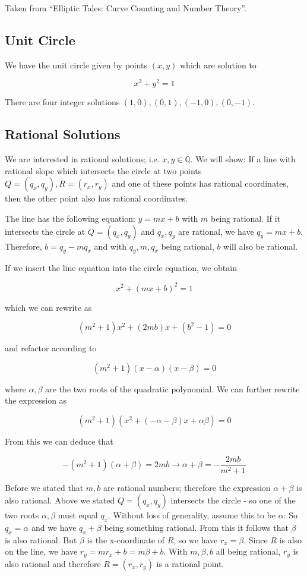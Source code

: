 
Taken from ``Elliptic Tales: Curve Counting and Number Theory''.

\subsection{Unit Circle}

We have the unit circle given by points \((x,y)\) which are solution to

\[
x^2 + y^2 = 1
\]

There are four integer solutions \((1,0), (0,1), (-1,0), (0,-1)\).

\subsection{Rational Solutions}

We are interested in rational solutions; i.e. \(x, y \in \mathbb{Q}\).
We will show: If a line with rational slope which intersects the circle
at two points \(Q = (q_x, q_y), R = (r_x, r_y)\) and one of these points
has rational coordinates, then the other point also has rational
coordinates.

The line has the following equation: \(y = mx + b\) with \(m\) being
rational. If it intersects the circle at \(Q = (q_x, q_y)\) and
\(q_x, q_y\) are rational, we have \(q_y = m x + b\). Therefore,
\(b = q_y - m q_x\) and with \(q_y, m, q_x\) being rational, \(b\) will
also be rational.

If we insert the line equation into the circle equation, we obtain

\[
x^2 + (m x + b)^2 = 1
\]

which we can rewrite as

\[
(m^2 + 1) x^2 + (2mb)x + (b^2 - 1) = 0
\]

and refactor according to

\[
(m^2 + 1)(x - \alpha)(x - \beta) = 0
\]

where \(\alpha, \beta\) are the two roots of the quadratic polynomial.
We can further rewrite the expression as

\[
(m^2 + 1)\left( x^2 + (- \alpha - \beta) x  + \alpha \beta \right) = 0
\]

From this we can deduce that

\[
- (m^2 + 1) (\alpha +  \beta) = 2mb \rightarrow \alpha + \beta = -\frac{2mb}{m^2 + 1}
\]

Before we stated that \(m, b\) are rational numbers; therefore the
expression \(\alpha + \beta\) is also rational. Above we stated
\(Q = (q_x, q_y)\) intersects the circle - so one of the two roots
\(\alpha, \beta\) must equal \(q_x\). Without loss of generality, assume
this to be \(\alpha\): So \(q_x = \alpha\) and we have \(q_x + \beta\)
being something rational. From this it follows that \(\beta\) is also
rational. But \(\beta\) is the x-coordinate of \(R\), so we have
\(r_x = \beta\). Since \(R\) is also on the line, we have
\(r_y = m r_x + b = m \beta + b\). With \(m, \beta, b\) all being
rational, \(r_y\) is also rational and therefore \(R=(r_x, r_y)\) is a
rational point.

